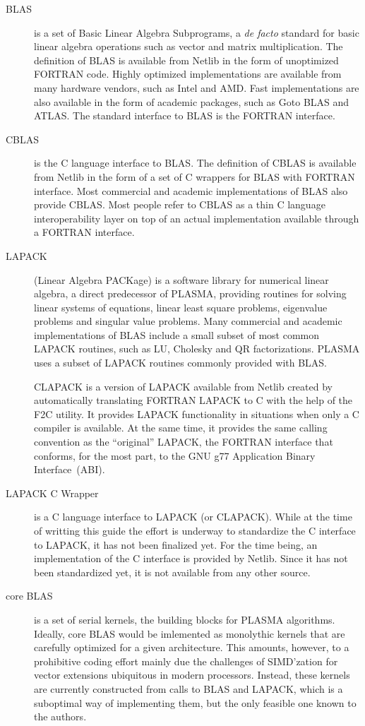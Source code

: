 \begin{description}
\item[BLAS]
is a set of Basic Linear Algebra Subprograms, a {\em de facto} standard for basic linear algebra
operations such as vector and matrix multiplication.
The definition of BLAS is available from Netlib in the form of unoptimized FORTRAN code.
Highly optimized implementations are available from many hardware vendors, such as Intel and AMD.
Fast implementations are also available in the form of academic packages, such as Goto BLAS
and ATLAS.
The standard interface to BLAS is the FORTRAN interface.

\item[CBLAS]
is the C language interface to BLAS.
The definition of CBLAS is available from Netlib in the form of a set of C wrappers for BLAS
with FORTRAN interface. Most commercial and academic implementations of BLAS also provide CBLAS.
Most people refer to CBLAS as a thin C language interoperability layer on top of an actual
implementation available through a FORTRAN interface.

\item[LAPACK]
(Linear Algebra PACKage) is a software library for numerical linear algebra, a direct predecessor
of PLASMA, providing routines for solving linear systems of equations, linear least square problems,
eigenvalue problems and singular value problems.
Many commercial and academic implementations of BLAS include a small subset of most common LAPACK
routines, such as LU, Cholesky and QR factorizations.
PLASMA uses a subset of LAPACK routines commonly provided with BLAS.

CLAPACK is a version of LAPACK available from Netlib created by automatically translating FORTRAN
LAPACK to C with the help of the F2C utility.
It provides LAPACK functionality in situations when only a C compiler is available.
At the same time, it provides the same calling convention as the ``original'' LAPACK,
the FORTRAN interface that conforms, for the most part, to the GNU g77 Application Binary
Interface~(ABI).

\item[LAPACK C Wrapper]
is a C language interface to LAPACK (or CLAPACK).
While at the time of writting this guide the effort is underway to standardize the C interface
to LAPACK, it has not been finalized yet.
For the time being, an implementation of the C interface is provided by Netlib.
Since it has not been standardized yet, it is not available from any other source.

\item[core BLAS]
is a set of serial kernels, the building blocks for PLASMA algorithms.
Ideally, core BLAS would be imlemented as monolythic kernels that are carefully optimized
for a given architecture.
This amounts, however, to a prohibitive coding effort mainly due the challenges of SIMD'zation
for vector extensions ubiquitous in modern processors.
Instead, these kernels are currently constructed from calls to BLAS and LAPACK, which is a suboptimal
way of implementing them, but the only feasible one known to the authors.


\end{description}

